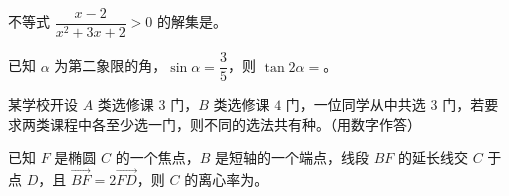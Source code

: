 \begin{question}
不等式 $\dfrac{x-2}{x^2+3x+2}>0$ 的解集是\gkblank{}。

\end{question}
\begin{question}
已知 $\alpha$ 为第二象限的角，$\sin\alpha=\dfrac35$，则 $\tan2\alpha=$\gkblank{}。

\end{question}
\begin{question}
某学校开设 $A$ 类选修课 $3$ 门，$B$ 类选修课 $4$ 门，一位同学从中共选 $3$ 门，若要求两类课程中各至少选一门，则不同的选法共有\gkblank{}种。（用数字作答）

\end{question}
\begin{question}
已知 $F$ 是椭圆 $C$ 的一个焦点，$B$ 是短轴的一个端点，线段 $BF$ 的延长线交 $C$ 于点 $D$，且 $\overrightarrow{BF}=2\overrightarrow{FD}$，则 $C$ 的离心率为\gkblank{}。

\end{question}

